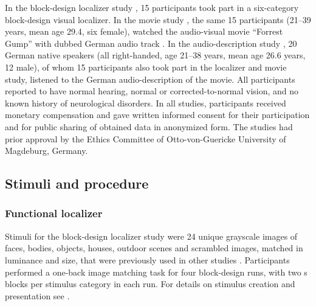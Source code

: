 In the block-design localizer study \citep{sengupta2016extension}, 15
participants took part in a six-category block-design visual localizer.
In the movie study \citep{hanke2016simultaneous}, the same 15 participants
(21–39 years, mean age 29.4, six female), watched the audio-visual movie
``Forrest Gump'' \citep{ForrestGumpMovie} with dubbed German audio track
\citep{ForrestGumpDVD}.
In the audio-description study \citep{hanke2014audiomovie}, 20 German native
speakers (all right-handed, age 21–38 years, mean age 26.6 years, 12 male), of
whom 15 participants also took part in the localizer and movie study, listened
to the German audio-description \citep{ForrestGumpGermanAD} of the movie.
All participants reported to have normal hearing, normal or corrected-to-normal
vision, and no known history of neurological disorders.
In all studies, participants received monetary compensation and gave written
informed consent for their participation and for public sharing of obtained data
in anonymized form. The studies had prior approval by the Ethics Committee of
Otto-von-Guericke University of Magdeburg, Germany.


\subsection{Stimuli and procedure}


\subsubsection{Functional localizer}

Stimuli for the block-design localizer study were 24 unique grayscale images of
faces, bodies, objects, houses, outdoor scenes and scrambled images, matched in
luminance and size, that were previously used in other studies
\citep[e.g.,][]{haxby2011common}.
Participants performed a one-back image matching task for four block-design
runs, with two \unit[16]{s} blocks per stimulus category in each run.
%
For details on stimulus creation and presentation see
\citet{sengupta2016extension}.


